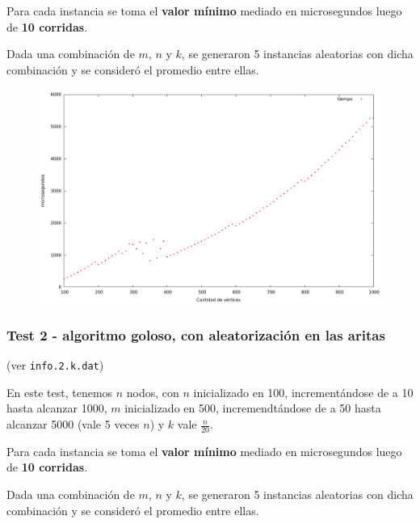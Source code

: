 Para cada instancia se toma el \textbf{valor mínimo} mediado en microsegundos luego de \textbf{10 corridas}.

Dada una combinación de $m$, $n$ y $k$, se generaron 5 instancias aleatorias con dicha combinación y se consideró el promedio entre ellas.

\vspace*{0.5cm}

\begin{figure}[h]
  \begin{center}
    \includegraphics[scale=0.35]{imagenes/grafico-greedy-ac.png}
  \end{center}
\end{figure}

\vspace*{0.5cm}


\newpage
\subsubsection{Test 2 - algoritmo goloso, con aleatorización en las aritas}

(ver \verb|info.2.k.dat|) \medskip

En este test, tenemos $n$ nodos, con $n$ inicializado en 100, incrementándose de a 10 hasta alcanzar 1000, $m$ inicializado en 500, incremendtándose de a 50 hasta alcanzar 5000 (vale 5 veces $n$) y $k$ vale $\frac{n}{20}$.

Para cada instancia se toma el \textbf{valor mínimo} mediado en microsegundos luego de \textbf{10 corridas}.

Dada una combinación de $m$, $n$ y $k$, se generaron 5 instancias aleatorias con dicha combinación y se consideró el promedio entre ellas.

